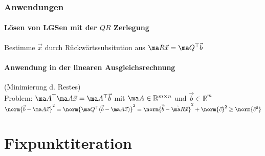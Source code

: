 \documentclass[fs, footer]{latex4ei}
\begin{document}
\begin{multicols*}{4}
{	\subsubsection*{Anwendungen}
	\paragraph{Lösen von LGSen mit der $Q R$ Zerlegung}
	Bestimme $\vec x$ durch Rückwärtssubsitution aus $\ma R \vec x = \ma Q^\top \vec b$
	\paragraph{Anwendung in der linearen Ausgleichsrechnung}
	(Minimierung d. Restes)\\
	Problem: $\ma A^\top \ma A \vec x = \ma A^\top \vec b$ mit $\ma A \in \mathbb R^{m \times n }$ und $\vec b \in \mathbb R^{m}$ \\ 
	$\norm{\vec b - \ma A \vec x}^2 = \norm{\ma Q^\top (\vec b - \ma A \vec x)}^2 = \norm{\tilde{\vec b} - \tilde{\ma R} \vec x}^2 + \norm{\vec c}^2 \ge \norm{\vec c^2}$
	}
\section{Fixpunktiteration}

\end{multicols*}
\end{document}
